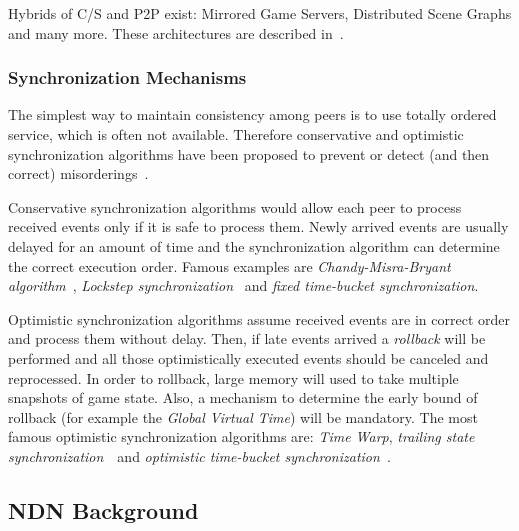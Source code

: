 \documentclass{sigchi}
\newcommand{\cs}{C\slash S}
\begin{document}
Hybrids of {\cs} and P2P exist: Mirrored Game Servers, Distributed Scene Graphs and many more. These architectures are described in~\cite{Ldsg, Scheating, Fgame, Csync}.


\subsubsection{Synchronization Mechanisms}
\label{syncalgr}

The simplest way to maintain consistency among peers is to use totally ordered service, which is often not available. Therefore conservative and optimistic synchronization algorithms have been proposed to prevent or detect (and then correct) misorderings~\cite{Fgame}. 

Conservative synchronization algorithms would allow each peer to process received events only if it is safe to process them. Newly arrived events are usually delayed for an amount of time and the synchronization algorithm can determine the correct execution order. Famous examples are \emph{Chandy-Misra-Bryant algorithm}~\cite{Chandy, Bryant}, \emph{Lockstep synchronization}~\cite{Flockstep} and \emph{fixed time-bucket synchronization}. %

Optimistic synchronization algorithms assume received events are in correct order and process them without delay. Then, if late events arrived a \emph{rollback} will be performed and all those optimistically executed events should be canceled and reprocessed. In order to rollback, large memory will used to take multiple snapshots of game state. Also, a mechanism to determine the early bound of rollback (for example the \emph{Global Virtual Time}) will be mandatory. The most famous optimistic synchronization algorithms are: \emph{Time Warp}, \emph{trailing state synchronization}~\cite{Csync}~and \emph{optimistic time-bucket synchronization}~\cite{Doptbkt}.

\subsection{NDN Background}
\label{ndnbg}
\end{document}
